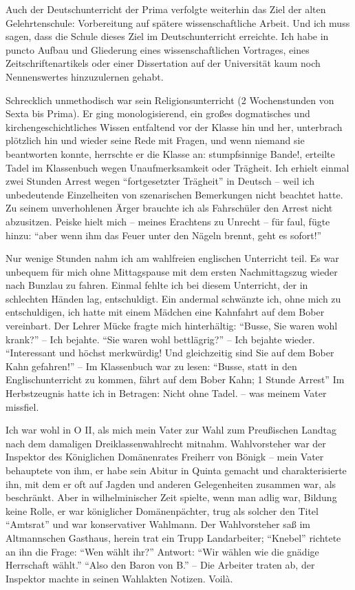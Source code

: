 Auch der Deutschunterricht der Prima verfolgte weiterhin das Ziel der alten Gelehrtenschule: Vorbereitung auf spätere wissenschaftliche Arbeit. Und ich muss sagen, dass die Schule dieses Ziel im Deutschunterricht erreichte. Ich habe in puncto Aufbau und Gliederung eines wissenschaftlichen Vortrages, eines Zeitschriftenartikels oder einer Dissertation auf der Universität kaum noch Nennenswertes hinzuzulernen gehabt.

Schrecklich unmethodisch war sein Religionsunterricht (2 Wochenstunden von Sexta bis Prima). Er ging monologisierend, ein großes dogmatisches und kirchengeschichtliches Wissen entfaltend vor der Klasse hin und her, unterbrach plötzlich hin und wieder seine Rede mit Fragen, und wenn niemand sie beantworten konnte, herrschte er die Klasse an: stumpfsinnige Bande!, erteilte Tadel im Klassenbuch wegen Unaufmerksamkeit oder Trägheit. Ich erhielt einmal zwei Stunden Arrest wegen \enquote{fortgesetzter Trägheit} in Deutsch -- weil ich unbedeutende Einzelheiten von szenarischen Bemerkungen nicht beachtet hatte. Zu seinem unverhohlenen Ärger brauchte ich als Fahrschüler den Arrest nicht abzusitzen. Peiske hielt mich -- meines Erachtens zu Unrecht -- für faul, fügte hinzu: \enquote{aber wenn ihm das Feuer unter den Nägeln brennt, geht es sofort!}

Nur wenige Stunden nahm ich am wahlfreien englischen Unterricht teil. Es war unbequem für mich ohne Mittagspause mit dem ersten Nachmittagszug wieder nach Bunzlau zu fahren. Einmal fehlte ich bei diesem Unterricht, der in schlechten Händen lag, entschuldigt. Ein andermal schwänzte ich, ohne mich zu entschuldigen, ich hatte mit einem Mädchen eine Kahnfahrt auf dem Bober vereinbart. Der Lehrer Mücke fragte mich hinterhältig: \enquote{Busse, Sie waren wohl krank?} -- Ich bejahte. \enquote{Sie waren wohl bettlägrig?} -- Ich bejahte wieder. \enquote{Interessant und höchst merkwürdig! Und gleichzeitig sind Sie auf dem Bober Kahn gefahren!} -- Im Klassenbuch war zu lesen: \enquote{Busse, statt in den Englischunterricht zu kommen, fährt auf dem Bober Kahn; 1 Stunde Arrest} Im Herbstzeugnis hatte ich in Betragen: Nicht ohne Tadel. -- was meinem Vater missfiel.

Ich war wohl in O II, als mich mein Vater zur Wahl zum Preußischen Landtag nach dem damaligen Dreiklassenwahlrecht mitnahm. Wahlvorsteher war der Inspektor des Königlichen Domänenrates Freiherr von Bönigk -- mein Vater behauptete von ihm, er habe sein Abitur in Quinta gemacht und charakterisierte ihn, mit dem er oft auf Jagden und anderen Gelegenheiten zusammen war, als beschränkt. Aber in wilhelminischer Zeit spielte, wenn man adlig war, Bildung keine Rolle, er war königlicher Domänenpächter, trug als solcher den Titel \enquote{Amtsrat} und war konservativer Wahlmann. Der Wahlvorsteher saß im Altmannschen Gasthaus, herein trat ein Trupp Landarbeiter; \enquote{Knebel} richtete an ihn die Frage: \enquote{Wen wählt ihr?} Antwort: \enquote{Wir wählen wie die gnädige Herrschaft wählt.} \enquote{Also den Baron von B.} -- Die Arbeiter traten ab, der Inspektor machte in seinen Wahlakten Notizen. Voilà.

